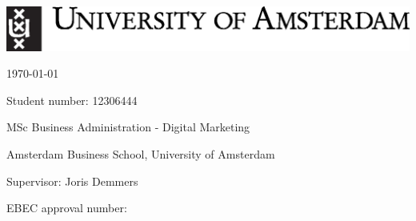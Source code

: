\makeatletter
\begin{titlepage}
  \begin{center}
    \includegraphics[scale=0.5]{images/uva_logo.eps}

    \vspace{0.8cm}

    \huge{\textbf{\@title}}

    \vspace{0.8cm}

    \large{\@author}

    \normalsize{\today}

  \end{center}

  \vfill


  \normalsize

  Student number: 12306444

  MSc Business Administration - Digital Marketing

  Amsterdam Business School, University of Amsterdam

  Supervisor: Joris Demmers

  EBEC approval number: 

\end{titlepage}
\makeatother

